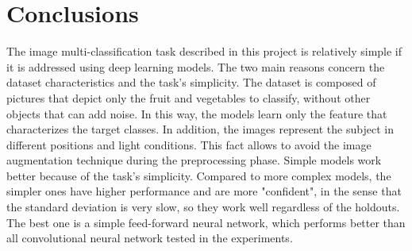 \section{Conclusions}\label{header-n631}

The image multi-classification task described in this project is
relatively simple if it is addressed using deep learning models. The two
main reasons concern the dataset characteristics and the task's
simplicity. The dataset is composed of pictures that depict only the
fruit and vegetables to classify, without other objects that can add
noise. In this way, the models learn only the feature that characterizes
the target classes. In addition, the images represent the subject in
different positions and light conditions. This fact allows to avoid the
image augmentation technique during the preprocessing phase. Simple
models work better because of the task's simplicity. Compared to more complex models, the simpler ones have higher performance and are more "confident", in the sense that the standard deviation is very slow, so they work well regardless of the holdouts. The best one is a simple feed-forward
neural network, which performs better than all convolutional neural network
tested in the experiments.


